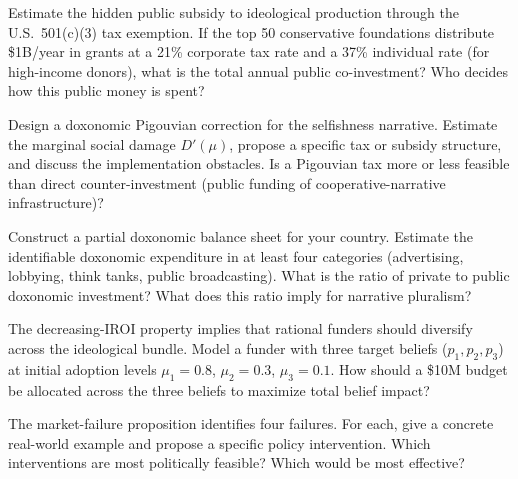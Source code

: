 \begin{exercise}
Estimate the hidden public subsidy to ideological production through the U.S.\ 501(c)(3) tax exemption.
If the top 50 conservative foundations distribute \$1B/year in grants at a 21\% corporate tax rate and a 37\% individual rate (for high-income donors), what is the total annual public co-investment?
Who decides how this public money is spent?
\end{exercise}

\begin{exercise}
\label{ex:ch10-pigouvian}
Design a doxonomic Pigouvian correction for the selfishness narrative.
Estimate the marginal social damage $D'(\mu)$, propose a specific tax or subsidy structure, and discuss the implementation obstacles.
Is a Pigouvian tax more or less feasible than direct counter-investment (public funding of cooperative-narrative infrastructure)?
\end{exercise}

\begin{exercise}
\label{ex:ch10-balance}
Construct a partial doxonomic balance sheet for your country.
Estimate the identifiable doxonomic expenditure in at least four categories (advertising, lobbying, think tanks, public broadcasting).
What is the ratio of private to public doxonomic investment?
What does this ratio imply for narrative pluralism?
\end{exercise}

\begin{exercise}
The decreasing-IROI property implies that rational funders should diversify across the ideological bundle.
Model a funder with three target beliefs ($p_1, p_2, p_3$) at initial adoption levels $\mu_1 = 0.8$, $\mu_2 = 0.3$, $\mu_3 = 0.1$.
How should a \$10M budget be allocated across the three beliefs to maximize total belief impact?
\end{exercise}

\begin{exercise}
The market-failure proposition identifies four failures.
For each, give a concrete real-world example and propose a specific policy intervention.
Which interventions are most politically feasible?
Which would be most effective?
\end{exercise}
